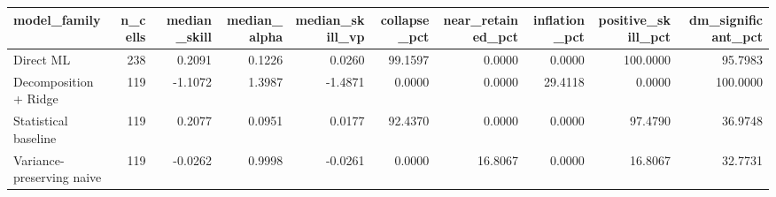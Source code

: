 \begin{tabular}{lrrrrrrrrr}
\toprule
model\_family & n\_cells & median\_skill & median\_alpha & median\_skill\_vp & collapse\_pct & near\_retained\_pct & inflation\_pct & positive\_skill\_pct & dm\_significant\_pct \\
\midrule
Direct ML & 238 & 0.2091 & 0.1226 & 0.0260 & 99.1597 & 0.0000 & 0.0000 & 100.0000 & 95.7983 \\
Decomposition + Ridge & 119 & -1.1072 & 1.3987 & -1.4871 & 0.0000 & 0.0000 & 29.4118 & 0.0000 & 100.0000 \\
Statistical baseline & 119 & 0.2077 & 0.0951 & 0.0177 & 92.4370 & 0.0000 & 0.0000 & 97.4790 & 36.9748 \\
Variance-preserving naive & 119 & -0.0262 & 0.9998 & -0.0261 & 0.0000 & 16.8067 & 0.0000 & 16.8067 & 32.7731 \\
\bottomrule
\end{tabular}
